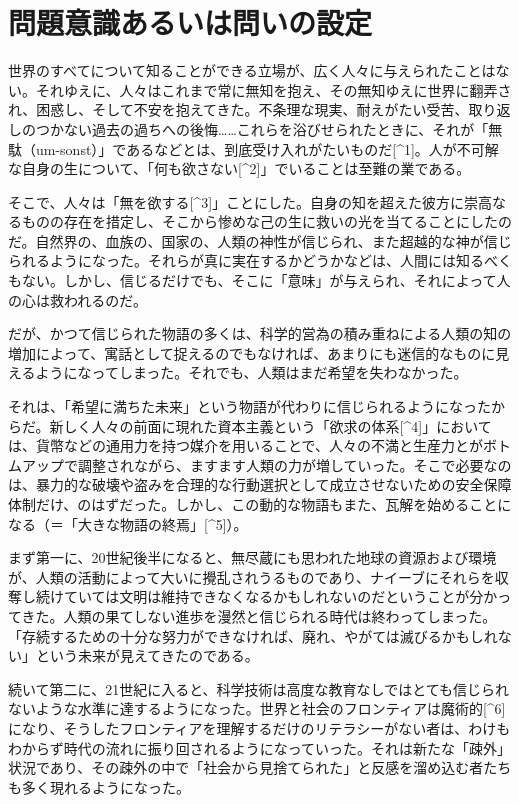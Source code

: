 \documentclass[
]{ltjsarticle}
\author{}
\date{}
\begin{document}
\section{問題意識あるいは問いの設定}\label{ux554fux984cux610fux8b58ux3042ux308bux3044ux306fux554fux3044ux306eux8a2dux5b9a}

世界のすべてについて知ることができる立場が、広く人々に与えられたことはない。それゆえに、人々はこれまで常に無知を抱え、その無知ゆえに世界に翻弄され、困惑し、そして不安を抱えてきた。不条理な現実、耐えがたい受苦、取り返しのつかない過去の過ちへの後悔\ldots\ldots これらを浴びせられたときに、それが「無駄（um-sonst）」であるなどとは、到底受け入れがたいものだ{[}\^{}1{]}。人が不可解な自身の生について、「何も欲さない{[}\^{}2{]}」でいることは至難の業である。

そこで、人々は「無を欲する{[}\^{}3{]}」ことにした。自身の知を超えた彼方に崇高なるものの存在を措定し、そこから惨めな己の生に救いの光を当てることにしたのだ。自然界の、血族の、国家の、人類の神性が信じられ、また超越的な神が信じられるようになった。それらが真に実在するかどうかなどは、人間には知るべくもない。しかし、信じるだけでも、そこに「意味」が与えられ、それによって人の心は救われるのだ。

だが、かつて信じられた物語の多くは、科学的営為の積み重ねによる人類の知の増加によって、寓話として捉えるのでもなければ、あまりにも迷信的なものに見えるようになってしまった。それでも、人類はまだ希望を失わなかった。

それは、「希望に満ちた未来」という物語が代わりに信じられるようになったからだ。新しく人々の前面に現れた資本主義という「欲求の体系{[}\^{}4{]}」においては、貨幣などの通用力を持つ媒介を用いることで、人々の不満と生産力とがボトムアップで調整されながら、ますます人類の力が増していった。そこで必要なのは、暴力的な破壊や盗みを合理的な行動選択として成立させないための安全保障体制だけ、のはずだった。しかし、この動的な物語もまた、瓦解を始めることになる（＝「大きな物語の終焉」{[}\^{}5{]}）。

まず第一に、20世紀後半になると、無尽蔵にも思われた地球の資源および環境が、人類の活動によって大いに攪乱されうるものであり、ナイーブにそれらを収奪し続けていては文明は維持できなくなるかもしれないのだということが分かってきた。人類の果てしない進歩を漫然と信じられる時代は終わってしまった。「存続するための十分な努力ができなければ、廃れ、やがては滅びるかもしれない」という未来が見えてきたのである。

続いて第二に、21世紀に入ると、科学技術は高度な教育なしではとても信じられないような水準に達するようになった。世界と社会のフロンティアは魔術的{[}\^{}6{]}になり、そうしたフロンティアを理解するだけのリテラシーがない者は、わけもわからず時代の流れに振り回されるようになっていった。それは新たな「疎外」状況であり、その疎外の中で「社会から見捨てられた」と反感を溜め込む者たちも多く現れるようになった。
\end{document}
